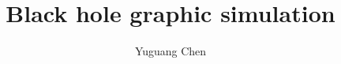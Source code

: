 \documentclass[prb,a4paper,showpacs,twocolumn,superscriptaddress,longbibliography]{revtex4-1}
\begin{document}
\title{Black hole graphic simulation}
\author{Yuguang Chen}
\maketitle


\end{document}
